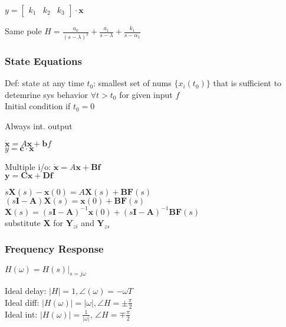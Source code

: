 \documentclass[4pt]{article}
\theoremstyle{definition}
\theoremstyle{definition}
\renewcommand{\o}{\omega}
\begin{document}
\begin{multicols}{3}
    \(y =
    \begin{bmatrix}
        k_1 & k_2 & k_3       %
    \end{bmatrix}
    \cdot \mathbf x
    \)

    Same pole                           %
    \(H = \frac{a_0}{(s-\lambda)^2} + \frac{a_1}{s-\lambda} + \frac{k_1}{s-\alpha_1}\)      %


\subsubsection{State Equations}
    Def: state at any time $t_0$: smallest set of nums $\{x_i(t_0)\}$ that is sufficient to detemrine sys behavior $\forall t > t_0$ for given input $f$\\
    Initial condition if $t_0 = 0$

    Always int. output

    \(\mathbf{\dot x} = A \mathbf x + \mathbf b f\)\\
    \(y = \mathbf{c} \cdot \mathbf x\)

    Multiple i/o:
    \(\mathbf{\dot x} = A \mathbf x + \mathbf B \mathbf f\)\\
    \(\mathbf y = \mathbf C \mathbf x + \mathbf D \mathbf f\)

    \(s \mathbf X(s) - \mathbf x(0) = A \mathbf X(s) + \mathbf B \mathbf F(s)\)\\
    \((s \mathbf I - \mathbf A) \mathbf X(s) = \mathbf x(0) + \mathbf B \mathbf F(s)\)\\
    \(\mathbf X(s) = (s \mathbf I - \mathbf A)^{-1} \mathbf x(0) + (s \mathbf I - \mathbf A)^{-1} \mathbf B \mathbf F(s)\)\\
    substitute $\mathbf X$ for $\mathbf Y_{zi}$ and $\mathbf Y_{zs}$
    



\subsubsection{Frequency Response}
    \(H(\o) = H(s)|_{s = j\o}\) %

    Ideal delay: \(|H| = 1, \angle(\o) = -\o T\)\\      %
    Ideal diff: \(|H(\o)| = |\o|, \angle H = \pm\frac {\pi} 2\)\\
    Ideal int: \(|H(\o)| = \frac 1 {|\o|}\), \(\angle H = \mp \frac{\pi} 2\)


\end{multicols}
\end{document}
